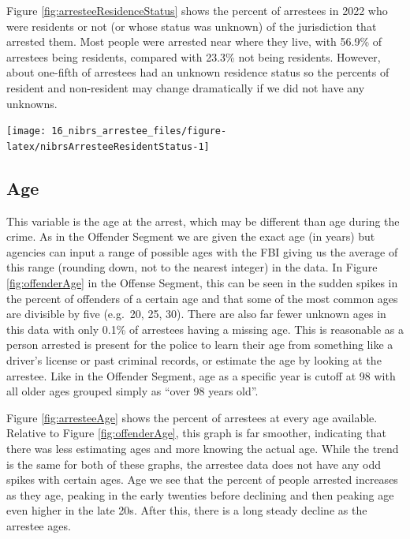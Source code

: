 \documentclass[
]{krantz}
\let\origfigure\figure
\let\endorigfigure\endfigure
\renewenvironment{figure}[1][2] {
    \expandafter\origfigure\expandafter[H]
} {
    \endorigfigure
}
\begin{document}
Figure \ref{fig:arresteeResidenceStatus} shows the percent
of arrestees in 2022 who were residents or not (or whose
status was unknown) of the jurisdiction that arrested them.
Most people were arrested near where they live, with 56.9\%
of arrestees being residents, compared with 23.3\% not being
residents. However, about one-fifth of arrestees had an
unknown residence status so the percents of resident and
non-resident may change dramatically if we did not have any
unknowns.

\begin{figure}

{\centering \texttt{[image: 16\_nibrs\_arrestee\_files/figure-latex/nibrsArresteeResidentStatus-1]} 

}

\caption{Annual resident status (i.e. if they live in the arresting jurisdiction) of arrestees, 1991-2022.}\label{fig:nibrsArresteeResidentStatus}
\end{figure}

\subsection{Age}\label{age-4}

This variable is the age at the arrest, which may be
different than age during the crime. As in the Offender
Segment we are given the exact age (in years) but agencies
can input a range of possible ages with the FBI giving us
the average of this range (rounding down, not to the nearest
integer) in the data. In Figure \ref{fig:offenderAge} in the
Offense Segment, this can be seen in the sudden spikes in
the percent of offenders of a certain age and that some of
the most common ages are divisible by five (e.g.~20, 25,
30). There are also far fewer unknown ages in this data with
only 0.1\% of arrestees having a missing age. This is
reasonable as a person arrested is present for the police to
learn their age from something like a driver's license or
past criminal records, or estimate the age by looking at the
arrestee. Like in the Offender Segment, age as a specific
year is cutoff at 98 with all older ages grouped simply as
``over 98 years old''.

Figure \ref{fig:arresteeAge} shows the percent of arrestees
at every age available. Relative to Figure
\ref{fig:offenderAge}, this graph is far smoother,
indicating that there was less estimating ages and more
knowing the actual age. While the trend is the same for both
of these graphs, the arrestee data does not have any odd
spikes with certain ages. Age we see that the percent of
people arrested increases as they age, peaking in the early
twenties before declining and then peaking age even higher
in the late 20s. After this, there is a long steady decline
as the arrestee ages.
\end{document}
